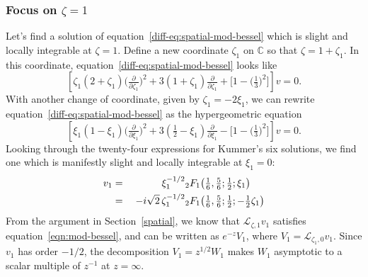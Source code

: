 \documentclass{article}
\newcommand{\C}{\mathbb{C}}
\newcommand{\laplace}{\mathcal{L}}
\begin{document}
\subsubsection{Focus on $\zeta = 1$}\label{pos-root}
Let's find a solution of equation~\eqref{diff-eq:spatial-mod-bessel} which is slight and locally integrable at $\zeta = 1$. Define a new coordinate $\zeta_1$ on $\C$ so that $\zeta = 1 + \zeta_1$. In this coordinate, equation~\eqref{diff-eq:spatial-mod-bessel} looks like
\begin{equation}%
\left[\zeta_1(2 + \zeta_1) \big(\tfrac{\partial}{\partial \zeta_1}\big)^2 + 3(1 + \zeta_1) \tfrac{\partial}{\partial \zeta_1} + \big[1 - \big(\tfrac{1}{3}\big)^2\big]\right] v = 0.
\end{equation}
With another change of coordinate, given by $\zeta_1 = -2\xi_1$, we can rewrite equation~\eqref{diff-eq:spatial-mod-bessel} as the hypergeometric equation
\begin{equation}\label{diff-eq:hypergeom-pos}
\left[\xi_1 (1 - \xi_1) \big(\tfrac{\partial}{\partial \xi_1}\big)^2 + 3(\tfrac{1}{2} - \xi_1) \tfrac{\partial}{\partial \xi_1} - \big[1 - \big(\tfrac{1}{3}\big)^2\big]\right] v = 0.
\end{equation}
Looking through the twenty-four expressions for Kummer's six solutions, we find one \cite[formula~15.10.12]{dlmf} which is manifestly slight and locally integrable at $\xi_1 = 0$:
\begin{alignat*}{2}
v_1 &=\;& \hphantom{-i\sqrt{2}}\,\xi_1^{-1/2} & {}_2F_1\big(\tfrac{1}{6}, \tfrac{5}{6}; \tfrac{1}{2}; \xi_1\big) \\
&=\;& -i\sqrt{2}\,\zeta_1^{-1/2} & {}_2F_1\big(\tfrac{1}{6}, \tfrac{5}{6}; \tfrac{1}{2}; -\tfrac{1}{2}\zeta_1\big)
\end{alignat*}
From the argument in Section~\ref{spatial}, we know that $\laplace_{\zeta, 1} v_1$ satisfies equation~\eqref{eqn:mod-bessel}, and can be written as $e^{-z} V_1$, where $V_1 = \laplace_{\zeta_1, 0} v_1$. Since $v_1$ has order $-1/2$, the decomposition $V_1 = z^{1/2} W_1$ makes $W_1$ asymptotic to a scalar multiple of $z^{-1}$ at $z = \infty$.
\end{document}
